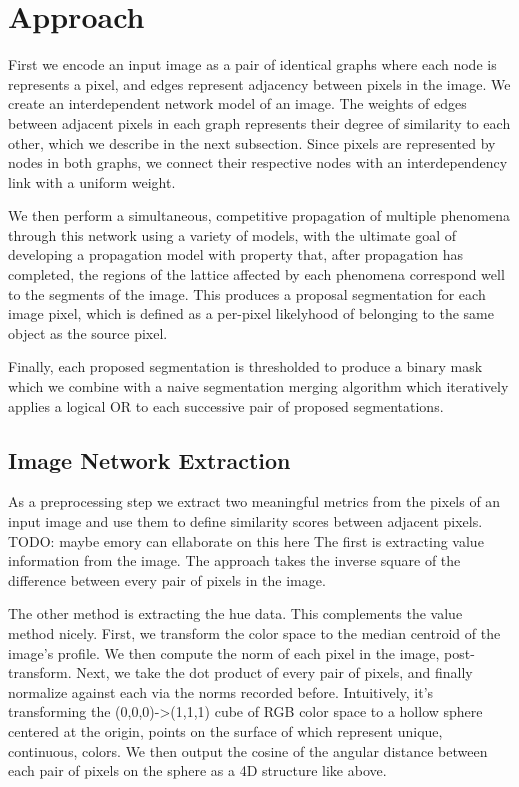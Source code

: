 \documentclass[twocolumn]{article}
\newcommand{\todo}[1]{}
\renewcommand{\todo}[1]{{\color{red} TODO: {#1}}}
\newcommand{\seclab}[1]{\label{sec:#1}}
\begin{document}
\section{Approach}\seclab{approach}

First we encode an input image as a pair of identical graphs where each node is
represents a pixel, and edges represent adjacency between pixels in the image.
We create an interdependent network model of an image. The weights of
edges between adjacent pixels in each graph represents their degree of
similarity to each other, which we describe in the next subsection. Since pixels
are represented by nodes in both graphs, we connect their respective nodes with
an interdependency link with a uniform weight.

We then perform a simultaneous, competitive propagation of multiple
phenomena through this network using a variety of models, with the ultimate goal
of developing a propagation model with property that, after propagation has
completed, the regions of the lattice affected by each phenomena correspond well
to the segments of the image. This produces a proposal segmentation for each
image pixel, which is defined as a per-pixel likelyhood of belonging to the same
object as the source pixel.

Finally, each proposed segmentation is thresholded to produce a binary mask
which we combine with a naive segmentation merging algorithm which iteratively
applies a logical OR to each successive pair of proposed segmentations. 

\subsection{Image Network Extraction}

As a preprocessing step we extract two meaningful metrics from the pixels of an
input image and use them to define similarity scores between adjacent pixels.
\todo{maybe emory can ellaborate on this here}
The first is extracting value information from the image.
The approach takes the inverse square of the difference between every pair of
pixels in the image. 

The other method is extracting the hue data. This complements the value method
nicely.  First, we transform the color space to the median centroid of the
image's profile. We then compute the norm of each pixel in the image,
post-transform.  Next, we take the dot product of every pair of pixels, and
finally normalize against each via the norms recorded before.  Intuitively, it's
transforming the (0,0,0)->(1,1,1) cube of RGB color space to a hollow sphere
centered at the origin, points on the surface of which represent unique,
continuous, colors. We then output the cosine of the angular distance between
each pair of pixels on the sphere as a 4D structure like above.
\end{document}
